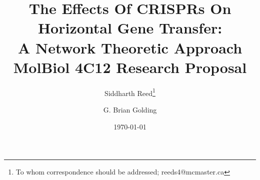 \documentclass[12pt,letter]{article}
\begin{document}
\title{The Effects Of CRISPRs On Horizontal Gene Transfer:\\
        A Network Theoretic Approach\\ \vspace{0.5cm}
       \Large MolBiol 4C12 Research Proposal}
\author[1]{Siddharth Reed\thanks{To whom correspondence should be addressed; reeds4@mcmaster.ca}}
\author[1]{G. Brian Golding}
\date{\today}
\maketitle

\newpage
\linespread{1.25}%








\printbibliography
\end{document}

